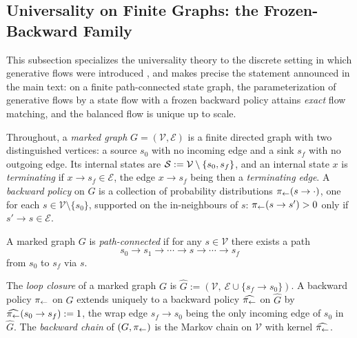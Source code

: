 \subsection{Universality on Finite Graphs: the Frozen-Backward Family}\label{app:universality_graphs}

This subsection specializes the universality theory to the discrete setting in which generative flows were introduced \cite{bengio2021flow}, and makes precise the statement announced in the main text: on a finite path-connected state graph, the parameterization of generative flows by a state flow with a frozen backward policy \cite{morozov2025revisiting} attains \emph{exact} flow matching, and the balanced flow is unique up to scale.

Throughout, a \emph{marked graph} $G=(\mathcal V,\mathcal E)$ is a finite directed graph with two distinguished vertices: a source $s_0$ with no incoming edge and a sink $s_f$ with no outgoing edge. Its internal states are $\mathcal S:=\mathcal V\setminus\{s_0,s_f\}$, and an internal state $x$ is \emph{terminating} if $x\rightarrow s_f\in\mathcal E$, the edge $x\rightarrow s_f$ being then a \emph{terminating edge}. A \emph{backward policy} on $G$ is a collection of probability distributions $\pi_{\leftarrow}(s\rightarrow\cdot)$, one for each $s\in\mathcal V\setminus\{s_0\}$, supported on the in-neighbours of $s$: $\pi_{\leftarrow}(s\rightarrow s')>0$ only if $s'\rightarrow s\in \mathcal E$.

\begin{definition}\label{def:path_connected}
A marked graph $G$ is \emph{path-connected} if for any $s\in \mathcal V$ there exists a path $$s_0\rightarrow s_1 \rightarrow \cdots \rightarrow s\rightarrow \cdots \rightarrow s_f$$ from $s_0$ to $s_f$ via $s$.
\end{definition}

\begin{definition}\label{def:loop_closure}
The \emph{loop closure} of a marked graph $G$ is $\widehat G := (\mathcal V,\ \mathcal E\cup\{s_f\rightarrow s_0\})$. A backward policy $\pi_{\leftarrow}$ on $G$ extends uniquely to a backward policy $\widehat{\pi_{\leftarrow}}$ on $\widehat G$ by $\widehat{\pi_{\leftarrow}}(s_0\rightarrow s_f):=1$, the wrap edge $s_f\rightarrow s_0$ being the only incoming edge of $s_0$ in $\widehat G$. The \emph{backward chain} of $(G,\pi_{\leftarrow})$ is the Markov chain on $\mathcal V$ with kernel $\widehat{\pi_{\leftarrow}}$.
\end{definition}

